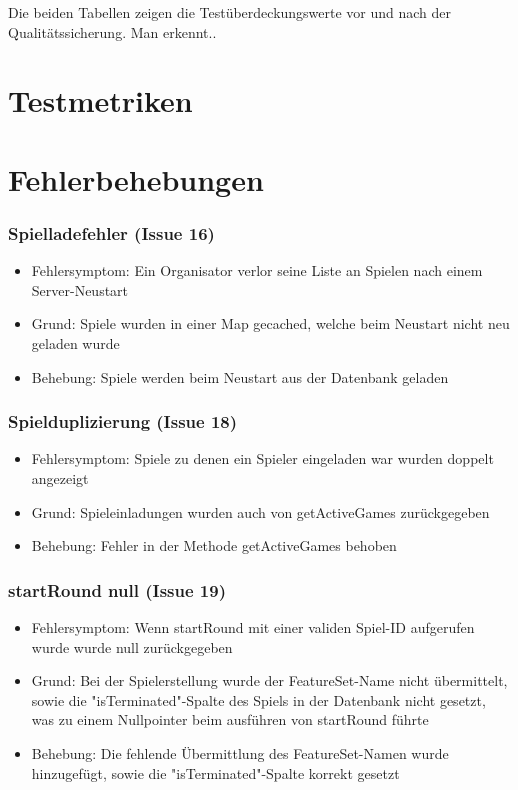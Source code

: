 \documentclass[a4paper]{scrreprt}
\begin{document}
    Die beiden Tabellen zeigen die Testüberdeckungswerte vor und nach der Qualitätssicherung. Man erkennt..



    \chapter{Testmetriken}



    \chapter{Fehlerbehebungen}

    \subsection{Spielladefehler (Issue 16)}
    \begin{itemize}
        \item Fehlersymptom: Ein Organisator verlor seine Liste an Spielen nach einem Server-Neustart
        \item Grund: Spiele wurden in einer Map gecached, welche beim Neustart nicht neu geladen wurde
        \item Behebung: Spiele werden beim Neustart aus der Datenbank geladen
    \end{itemize}
    \subsection{Spielduplizierung (Issue 18)}
    \begin{itemize}
        \item Fehlersymptom: Spiele zu denen ein Spieler eingeladen war wurden doppelt angezeigt
        \item Grund: Spieleinladungen wurden auch von getActiveGames zurückgegeben
        \item Behebung: Fehler in der Methode getActiveGames behoben
    \end{itemize}
    \subsection{startRound null (Issue 19)}
    \begin{itemize}
        \item Fehlersymptom: Wenn startRound mit einer validen Spiel-ID aufgerufen wurde wurde null zurückgegeben
        \item Grund: Bei der Spielerstellung wurde der FeatureSet-Name nicht übermittelt, sowie die "isTerminated"-Spalte des Spiels
        in der Datenbank nicht gesetzt, was zu einem Nullpointer beim ausführen von startRound führte
        \item Behebung: Die fehlende Übermittlung des FeatureSet-Namen wurde hinzugefügt, sowie die "isTerminated"-Spalte korrekt gesetzt
    \end{itemize}
\end{document}
